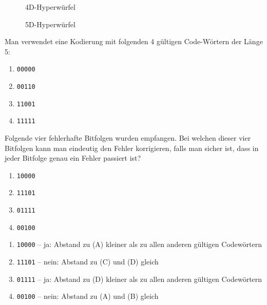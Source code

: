 \begin{figure}[H]
    \centering
    \caption{4D-Hyperwürfel}
    \label{fig:4d}
\end{figure}

\begin{figure}[H]
    \centering
    \caption{5D-Hyperwürfel}
    \label{fig:5d}
\end{figure}

\begin{myexercise}
    Man verwendet eine Kodierung mit folgenden 4 gültigen Code-Wörtern der Länge 5:
    \begin{enumerate}[label=(\Alph*)]
        \item \texttt{00000}
        \item \texttt{00110}
        \item \texttt{11001}
        \item \texttt{11111}
    \end{enumerate}
    Folgende vier fehlerhafte Bitfolgen wurden empfangen. Bei welchen dieser vier Bitfolgen kann man eindeutig den Fehler korrigieren, falls man sicher ist, dass in jeder Bitfolge genau ein Fehler passiert ist?
    \begin{enumerate}
        \item \texttt{10000}
        \item \texttt{11101}
        \item \texttt{01111}
        \item \texttt{00100}
    \end{enumerate}

    \begin{myanswer}
        \begin{enumerate}
            \item \texttt{10000} -- ja: Abstand zu (A) kleiner als zu allen anderen gültigen Codewörtern
            \item \texttt{11101} -- nein: Abstand zu (C) und (D) gleich
            \item \texttt{01111} -- ja: Abstand zu (D) kleiner als zu allen anderen gültigen Codewörtern
            \item \texttt{00100} -- nein: Abstand zu (A) und (B) gleich
        \end{enumerate}
    \end{myanswer}
\end{myexercise}



